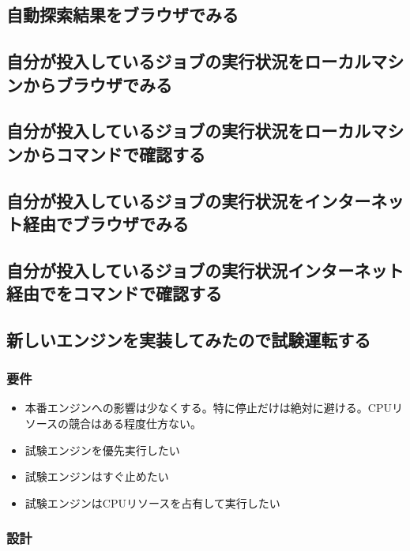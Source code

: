 \documentclass{jsbook}
\begin{document}
\subsection{自動探索結果をブラウザでみる}


\subsection{自分が投入しているジョブの実行状況をローカルマシンからブラウザでみる}

\subsection{自分が投入しているジョブの実行状況をローカルマシンからコマンドで確認する}

\subsection{自分が投入しているジョブの実行状況をインターネット経由でブラウザでみる}

\subsection{自分が投入しているジョブの実行状況インターネット経由でをコマンドで確認する}


\subsection{新しいエンジンを実装してみたので試験運転する}

\subsubsection{要件}

\begin{itemize}
    \item 本番エンジンへの影響は少なくする。特に停止だけは絶対に避ける。CPUリソースの競合はある程度仕方ない。
    \item 試験エンジンを優先実行したい
    \item 試験エンジンはすぐ止めたい
    \item 試験エンジンはCPUリソースを占有して実行したい
\end{itemize}

\subsubsection{設計}
\end{document}
